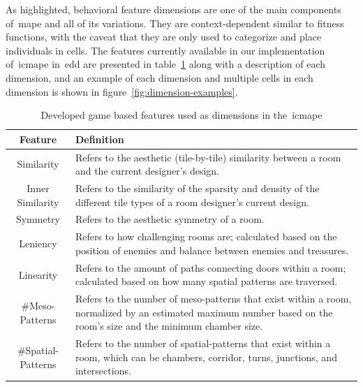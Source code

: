 As highlighted, behavioral feature dimensions are one of the main components of~\acrshort{mape} and all of its variations. They are context-dependent similar to fitness functions, with the caveat that they are only used to categorize and place individuals in cells. The features currently available in our implementation of~\acrshort{icmape} in~\acrshort{edd} are presented in table~\ref{table:mape-dimensions} along with a description of each dimension, and an example of each dimension and multiple cells in each dimension is shown in figure~\ref{fig:dimension-examples}. 

\begin{table}[ht]
\centering
\caption{Developed game based features used as dimensions in the~\acrlong{icmape}}\label{table:mape-dimensions}
\begin{tabularx}{\textwidth}{|c|X|}
\hline
\rule{0pt}{12pt}
Feature&Definition\\ \hline
Similarity & Refers to the aesthetic (tile-by-tile) similarity between a room and the current designer's design.\\ \hline
Inner Similarity & Refers to the similarity of the sparsity and density of the different tile types of a room designer's current design.\\ \hline
Symmetry & Refers to the aesthetic symmetry of a room.\\ \hline
Leniency & Refers to how challenging rooms are; calculated based on the position of enemies and balance between enemies and treasures.\\ \hline
Linearity & Refers to the amount of paths connecting doors within a room; calculated based on how many spatial patterns are traversed.\\ \hline
\#Meso-Patterns & Refers to the number of meso-patterns that exist within a room, normalized by an estimated maximum number based on the room's size and the minimum chamber size.\\ \hline
\#Spatial-Patterns & Refers to the number of spatial-patterns that exist within a room, which can be chambers, corridor, turns, junctions, and intersections.\\ \hline
\end{tabularx}
\end{table}


